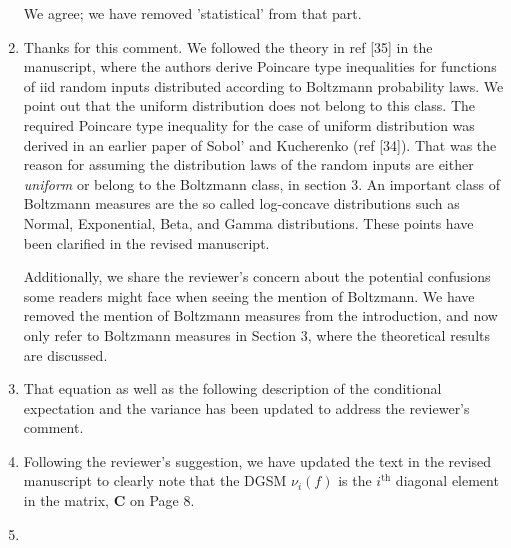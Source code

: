 \documentclass[11pt,final]{article}
\newcommand{\referee}[1]{\vspace{.1ex}\noindent{\textcolor{blue}{#1}}}
\begin{document}
\begin{enumerate}[wide, labelwidth=!, labelindent=0pt]
We agree; we have removed 'statistical' from that part.

\item \referee{7.29-30: Any PDF can be written in a Boltzmann form, V(x) is
just the negative log-PDF, I am not sure if it is necessary to bring up a
Boltzmann distribution language here.  Also, it could be confused with
Maxwell-Boltzmann distribution, which is a very specific PDF form.} 

Thanks for
this comment. We followed the theory in ref [35] in the manuscript, where the
authors derive Poincare type inequalities for functions of iid random inputs
distributed according to Boltzmann probability laws.  We point out that the
uniform distribution does not belong to this class.  The required Poincare type
inequality for the case of uniform distribution was derived in an earlier paper
of Sobol' and Kucherenko (ref [34]).  That was the reason for assuming the
distribution laws of the random inputs are either \emph{uniform} or belong to
the Boltzmann class, in section 3. An important class of Boltzmann measures are
the so called log-concave distributions such as Normal, Exponential, Beta, and
Gamma distributions. These points have been clarified in the revised
manuscript. 

Additionally, we share the reviewer's concern about the potential confusions
some readers might face when seeing the mention of Boltzmann. We have removed
the mention of Boltzmann measures from the introduction, and now only refer to
Boltzmann measures in Section 3, where the theoretical results are discussed. 
 

\item \referee{7.40: Explain what E and V are with respect to in Eq (8).}


That equation as well as the following description of the conditional 
expectation and the variance has been updated to address the reviewer's comment.

\item \referee{7.50: Just say in words that it is the i-th diagonal element of matrix C.}

Following the reviewer's suggestion, we have updated the text in the revised manuscript to
clearly note that the DGSM $\nu_i(f)$ is the $i^{\text{th}}$ diagonal element in the matrix, $\mathbf{C}$
on Page 8.

\item \referee{10.56: what if there is no eigenvalue gap of O(100)?}


\end{enumerate}
\end{document}
